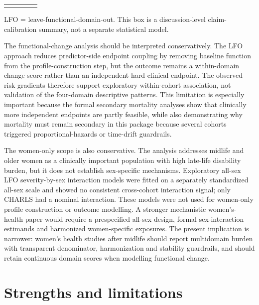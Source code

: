 \documentclass[pdflatex,sn-vancouver-num]{sn-jnl}
\begin{document}
\begin{center}
{\begin{minipage}{0.94\textwidth}
\begin{tabular}{@{}>{\raggedright\arraybackslash}p{0.21\linewidth}>{\raggedright\arraybackslash}p{0.39\linewidth}>{\raggedright\arraybackslash}p{0.32\linewidth}@{}}
\botrule
\end{tabular}
\vspace{4pt}
\par\footnotesize LFO = leave-functional-domain-out. This box is a discussion-level claim-calibration summary, not a separate statistical model.
\end{minipage}}
\end{center}

The functional-change analysis should be interpreted conservatively. The LFO approach reduces predictor-side endpoint coupling by removing baseline function from the profile-construction step, but the outcome remains a within-domain change score rather than an independent hard clinical endpoint. The observed risk gradients therefore support exploratory within-cohort association, not validation of the four-domain descriptive patterns. This limitation is especially important because the formal secondary mortality analyses show that clinically more independent endpoints are partly feasible, while also demonstrating why mortality must remain secondary in this package because several cohorts triggered proportional-hazards or time-drift guardrails.

The women-only scope is also conservative. The analysis addresses midlife and older women as a clinically important population with high late-life disability burden, but it does not establish sex-specific mechanisms. Exploratory all-sex LFO severity-by-sex interaction models were fitted on a separately standardized all-sex scale and showed no consistent cross-cohort interaction signal; only CHARLS had a nominal interaction. These models were not used for women-only profile construction or outcome modelling. A stronger mechanistic women's-health paper would require a prespecified all-sex design, formal sex-interaction estimands and harmonized women-specific exposures. The present implication is narrower: women's health studies after midlife should report multidomain burden with transparent denominator, harmonization and stability guardrails, and should retain continuous domain scores when modelling functional change.

\section{Strengths and limitations}\label{sec:limitations}
\end{document}
